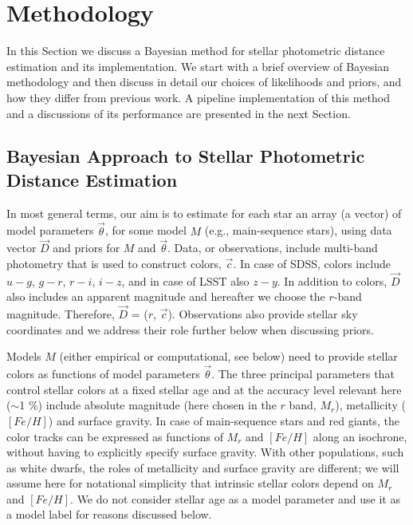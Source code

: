 
\section{Methodology}
\label{sec:method}

In this Section we discuss a Bayesian method for stellar photometric distance estimation and its implementation.
We start with a brief overview of Bayesian methodology and then discuss in detail our choices of likelihoods
and priors, and how they differ from previous work. A pipeline implementation of this method and a discussions
of its performance are presented in the next Section. 


\subsection{Bayesian Approach to Stellar Photometric Distance Estimation}

In most general terms, our aim is to estimate for each star an array (a vector) of model parameters $\vec{\theta}$,
for some model $M$ (e.g., main-sequence stars), using data vector $\vec{D}$ and priors for $M$ and $\vec{\theta}$.
Data, or observations, include multi-band photometry that is used
to construct colors, $\vec{c}$. In case of SDSS, colors include $u-g$, $g-r$, $r-i$, $i-z$, and in case of LSST also
$z-y$. In addition to colors, $\vec{D}$ also includes an apparent magnitude and hereafter we choose the $r$-band
magnitude. Therefore, $\vec{D}$ = ($r$, $\vec{c}$). Observations also provide stellar sky coordinates and we
address their role further below when discussing priors.

Models $M$ (either empirical or computational, see below) need to provide stellar colors as functions of model parameters
$\vec{\theta}$. 
The three principal parameters that control stellar colors at a fixed stellar age and at the accuracy level relevant here
($\sim$1 \%) include absolute magnitude (here chosen in the $r$ band, $M_r$), metallicity ($[Fe/H]$) and surface
gravity. In case of main-sequence stars and red giants, the color tracks can be expressed as functions of $M_r$
and $[Fe/H]$ along an isochrone, without having to explicitly specify surface gravity. With other populations,
such as white dwarfs, the roles of metallicity and surface gravity are different; we will
assume here for notational simplicity that intrinsic stellar colors depend on $M_r$ and $[Fe/H]$. We do not
consider stellar age as a model parameter and use it as a model label for reasons discussed below.  

